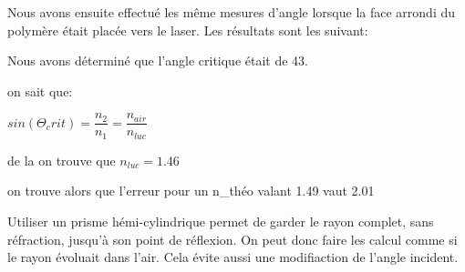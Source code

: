 \documentclass[11pt,a4paper]{report}
\begin{document}
Nous avons ensuite effectué les même mesures d'angle lorsque la face arrondi du polymère était placée vers le laser. Les résultats sont les suivant:



Nous avons déterminé que l'angle critique était de 43\degre .

on sait que:

$sin(\Theta _crit) = \dfrac{n_2}{n_1} = \dfrac{n_{air}}{n_{luc}}$ 

de la on trouve que $n_{luc} = 1.46$

on trouve alors que l'erreur pour un n_{théo} valant 1.49 vaut 2.01 %
 
Utiliser un prisme hémi-cylindrique permet de garder le rayon complet, sans réfraction, jusqu'à son point de réflexion. On peut donc faire les calcul comme si le rayon évoluait dans l'air. Cela évite aussi une modifiaction de l'angle incident.
\end{document}
